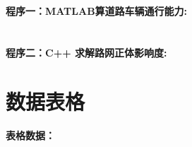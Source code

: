 \documentclass[a4paper]{nmmcm}
\begin{document}
\begin{appendices}

\section*{}

\textbf{\textcolor[rgb]{0.98,0.00,0.00}{程序一：MATLAB算道路车辆通行能力:}}


\section*{}

\textcolor[rgb]{0.98,0.00,0.00}{\textbf{程序二：C++ 求解路网正体影响度:}}


\newpage
\def\thesection{A}
\renewcommand{\thetable}{\wuhao A-\arabic{table}}
\setcounter{table}{0}
\section*{数据表格}
\textcolor[rgb]{0.98,0.00,0.00}{\textbf{表格数据：}}


\end{appendices}
\end{document}
